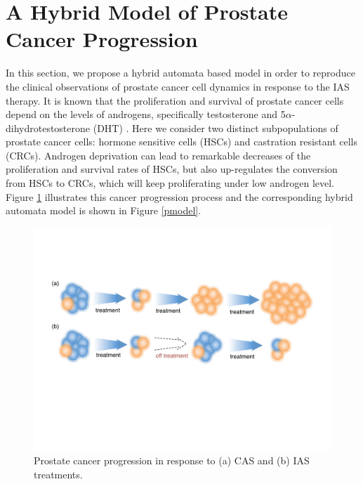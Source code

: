 \section{A Hybrid Model of Prostate Cancer Progression }\label{sec.model}

In this section, we propose a hybrid automata based model in order to reproduce the clinical observations \cite{bruchovsky06, bruchovsky07} of prostate cancer cell dynamics in response to the IAS therapy. It is known that the proliferation and survival of prostate cancer cells depend on the levels of androgens, specifically testosterone and 5$\alpha$-dihydrotestosterone (DHT) \cite{}. Here we consider two distinct subpopulations of prostate cancer cells: hormone sensitive cells (HSCs) and castration resistant cells (CRCs). Androgen deprivation can lead to remarkable decreases of the proliferation and survival rates of HSCs, but also up-regulates the conversion from HSCs to CRCs, which will keep proliferating under low androgen level. Figure \ref{progression} illustrates this cancer progression process and the corresponding hybrid automata model is shown in Figure \ref{pmodel}. 

\begin{figure}[htb]
\centering
\includegraphics[scale=0.38]{fig-progression}
\caption{Prostate cancer progression in response to (a) CAS and (b) IAS treatments.}
\label{progression}
\end{figure}

